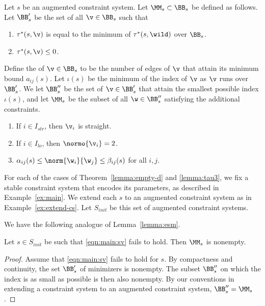 \begin{definition}
Let $s$ be an augmented constraint system.
Let $\MM_{s}\subset \BB_{s}$ be defined as follows.
Let $\BB'_{s}$ be the set of all $\v\in \BB_{s}$ such that
\begin{enumerate}
\item $\tau^*(s,\v)$ is equal to the minimum of $\tau^*(s,\wild)$ over $\BB_{s}$.
\item $\tau^*(s,\v)\le 0$.
\end{enumerate}
Define the  of $\v\in \BB_s$ to be the number of edges of $\v$
that attain its minimum bound $a_{i j}(s)$.  Let $\iota(s)$ be the minimum
of the index of $\v$ as $\v$ runs over $\BB'_s$.  
We let $\BB''_{s}$  be the set of $\v\in \BB'_{s}$ that attain
the smallest possible index $\iota(s)$,
and let $\MM_s$ be the subset of all $\w\in\BB''_s$ satisfying the additional
constraints.
\begin{enumerate}
\item If $i\in I_{str}$,  then $\v_i$ is straight.
\item If $i\in I_{lo}$,  then $\normo{\v_i}=2$.
\item $\alpha_{ij}(s)\le \norm{\w_i}{\w_j}\le \beta_{ij}(s)$ for all $i,j$.
\end{enumerate}
\end{definition}



\begin{definition}[$S_{init}$] 
For each of the cases of Theorem~\ref{lemma:empty-d} and \ref{lemma:tau3}, we fix a
stable constraint system that encodes its parameters, as described in Example~\ref{ex:main}. 
We extend each $s$ to an augmented constraint system
as in Example~\ref{ex:extend-cs}.
Let $S_{init}$ be this set of  augmented constraint systems.
\end{definition}

We have the following analogue of Lemma~\ref{lemma:esm}.

\begin{lemma}\label{lemma:init}
Let $s\in S_{init}$ be such that
\eqref{eqn:main:sv} fails to hold.
Then $\MM_s$ is nonempty.
\end{lemma}

\begin{proof}  Assume that \eqref{eqn:main:sv} fails to hold for
$s$.  By compactness and continuity, the set 
$\BB'_s$ of minimizers is nonempty.   
The subset $\BB''_s$ on which the index is as small as possible
is then also nonempty.  By our conventions in extending a constraint
system to an augmented constraint system, $\BB''_s = \MM_s$.
\end{proof}

